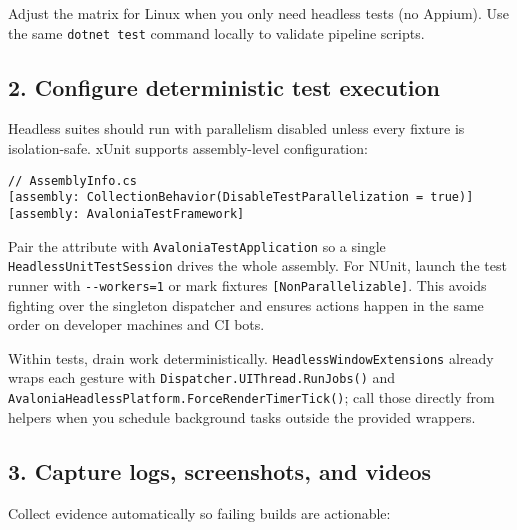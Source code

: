 Adjust the matrix for Linux when you only need headless tests (no
Appium). Use the same \passthrough{\lstinline!dotnet test!} command
locally to validate pipeline scripts.

\subsection{2. Configure deterministic test
execution}\label{configure-deterministic-test-execution}

Headless suites should run with parallelism disabled unless every
fixture is isolation-safe. xUnit supports assembly-level configuration:

\begin{lstlisting}
// AssemblyInfo.cs
[assembly: CollectionBehavior(DisableTestParallelization = true)]
[assembly: AvaloniaTestFramework]
\end{lstlisting}

Pair the attribute with
\passthrough{\lstinline!AvaloniaTestApplication!} so a single
\passthrough{\lstinline!HeadlessUnitTestSession!} drives the whole
assembly. For NUnit, launch the test runner with
\passthrough{\lstinline!--workers=1!} or mark fixtures
\passthrough{\lstinline![NonParallelizable]!}. This avoids fighting over
the singleton dispatcher and ensures actions happen in the same order on
developer machines and CI bots.

Within tests, drain work deterministically.
\passthrough{\lstinline!HeadlessWindowExtensions!} already wraps each
gesture with \passthrough{\lstinline!Dispatcher.UIThread.RunJobs()!} and
\passthrough{\lstinline!AvaloniaHeadlessPlatform.ForceRenderTimerTick()!};
call those directly from helpers when you schedule background tasks
outside the provided wrappers.

\subsection{3. Capture logs, screenshots, and
videos}\label{capture-logs-screenshots-and-videos}

Collect evidence automatically so failing builds are actionable:

